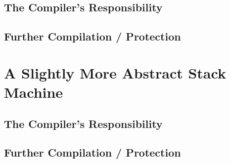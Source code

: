 \documentclass{article}
\begin{document}
\subsection{The Compiler's Responsibility}

\subsection{Further Compilation / Protection}

\section{A Slightly More Abstract Stack Machine}

\subsection{The Compiler's Responsibility}

\subsection{Further Compilation / Protection}
\end{document}
